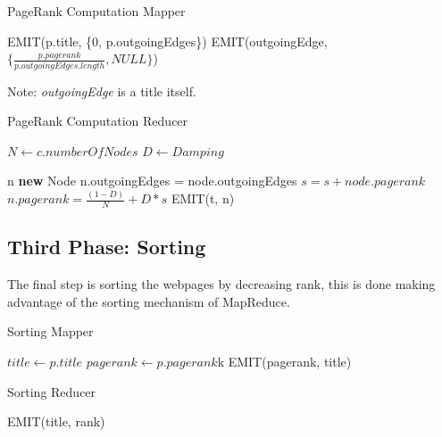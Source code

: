 \begin{algorithm}
	\caption{PageRank Computation Mapper}\label{Mapper}
		\begin{algorithmic}[1]
			
			\State EMIT(p.title, \{0, p.outgoingEdges\})
			\State EMIT(outgoingEdge, $\{\frac{p.pagerank}{p.outgoingEdges.length}, NULL\}$)
			\EndFor
			\EndProcedure
	\end{algorithmic}
\end{algorithm}
Note: \textit{outgoingEdge} is a title itself.


\begin{algorithm}[H]
	\caption{PageRank Computation Reducer}\label{Reducer}
		\begin{algorithmic}[1]
				\State $N \gets c.numberOfNodes$
				\State $D \gets Damping$
			\EndProcedure
		
					\State n \textbf{new} Node
							\State n.outgoingEdges = node.outgoingEdges
						\Else
							\State $s = s + node.pagerank$
						\EndIf
					\EndFor
					\State$n.pagerank =  \frac{(1-D)}{N} + D*s$
					\State EMIT(t, n)
			\EndProcedure
	\end{algorithmic}
\end{algorithm}



\subsection{Third Phase: Sorting}
The final step is sorting the webpages by decreasing rank, this is done making advantage of the sorting mechanism of MapReduce.

\begin{algorithm}[H]
	\caption{Sorting Mapper}\label{Mapper}
	\begin{algorithmic}[1]
		\State $title \gets p.title$
		\State $pagerank \gets p.pagerank$k
		\State EMIT(pagerank, title)
		\EndProcedure
	\end{algorithmic}
\end{algorithm}

\begin{algorithm}[H]
	\caption{Sorting Reducer}\label{Reducer}
	\begin{algorithmic}[1]
		\State EMIT(title, rank)
		\EndFor
		\EndProcedure
	\end{algorithmic}
\end{algorithm}
